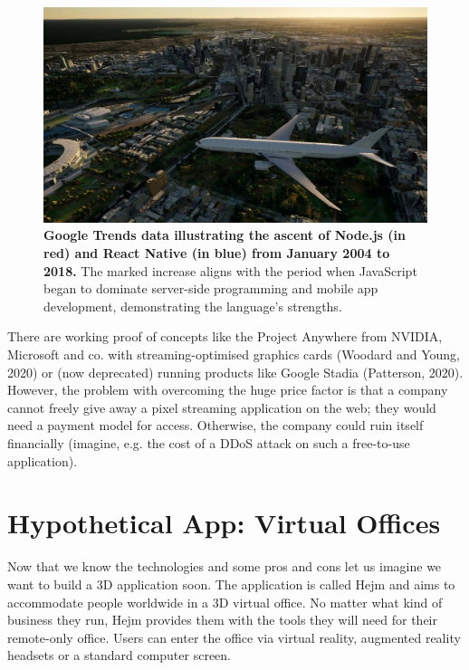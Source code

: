 \documentclass[10pt]{article}
\begin{document}
\begin{sloppypar}
  \begin{figure}[ht]
    \centering
    \includegraphics[width=\textwidth]{figures/project-anywhere.jpg}
    \caption[Google Trends data illustrating the ascent of Node.js and React Native.]{\textbf{Google Trends data illustrating the ascent of Node.js (in red) and React Native (in blue) from January 2004 to 2018.} The marked increase aligns with the period when JavaScript began to dominate server-side programming and mobile app development, demonstrating the language’s strengths.}
    \label{fig:project-anywhere}
  \end{figure}

  There are working proof of concepts like the Project Anywhere from NVIDIA, Microsoft and co. with streaming-optimised graphics cards (Woodard and Young, 2020) or (now deprecated) running products like Google Stadia (Patterson, 2020). However, the problem with overcoming the huge price factor is that a company cannot freely give away a pixel streaming application on the web; they would need a payment model for access. Otherwise, the company could ruin itself financially (imagine, e.g. the cost of a DDoS attack on such a free-to-use application).

  \section{Hypothetical App: Virtual Offices}
  \label{sec:hypothetical-app-virtual-offices}

  Now that we know the technologies and some pros and cons let us imagine we want to build a 3D application soon. The application is called Hejm and aims to accommodate people worldwide in a 3D virtual office. No matter what kind of business they run, Hejm provides them with the tools they will need for their remote-only office. Users can enter the office via virtual reality, augmented reality headsets or a standard computer screen.


\end{sloppypar}
\end{document}

